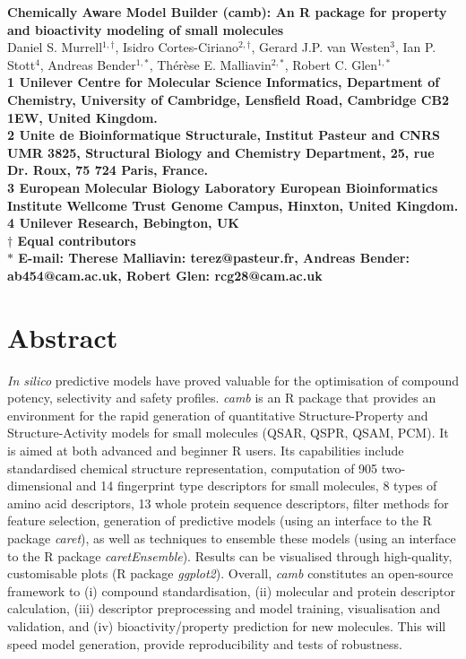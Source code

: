\documentclass[twoside,a4wide,10pt]{article}
\date{}
\begin{document}
\begin{flushleft}
{\Large
\textbf{Chemically Aware Model Builder (camb): An R package for property and bioactivity modeling of small molecules}
}
\\

Daniel S. Murrell$^{1,\dag}$,
Isidro Cortes-Ciriano$^{2,\dag}$,
Gerard J.P. van Westen$^{3}$,
Ian P. Stott$^{4}$,
Andreas Bender$^{1,\ast}$,
Th\'er\`ese E. Malliavin$^{2,\ast}$,
Robert C. Glen$^{1,\ast}$\\

\bf{1} Unilever Centre for Molecular Science Informatics, Department of Chemistry, University of Cambridge, Lensfield Road, Cambridge CB2 1EW, United Kingdom.
\\
\bf{2} Unite de Bioinformatique Structurale, Institut Pasteur and CNRS UMR 3825, Structural Biology and Chemistry Department, 25, rue Dr. Roux, 75 724 Paris, France.
\\
\bf{3} European Molecular Biology Laboratory European Bioinformatics Institute Wellcome Trust Genome Campus, Hinxton, United Kingdom.
\\
\bf{4} Unilever Research, Bebington, UK
\\
$\dag$ Equal contributors\\
$\ast$ E-mail: Therese Malliavin: terez@pasteur.fr, Andreas Bender: ab454@cam.ac.uk, Robert Glen: rcg28@cam.ac.uk


\end{flushleft}







\section*{Abstract}

{\it In silico} predictive models have proved valuable for the optimisation of compound potency, selectivity and safety profiles.
{\it camb} is an R package that provides an environment for the rapid generation of quantitative Structure-Property and Structure-Activity models for small molecules (QSAR, QSPR, QSAM, PCM). 
It is aimed at both advanced and beginner R users.
Its capabilities include standardised chemical structure representation, computation of 905 two-dimensional and 14 fingerprint type descriptors for small molecules, 8 types of amino acid descriptors, 13 whole protein sequence descriptors, filter methods for feature selection, 
generation of predictive models (using an interface to the R package {\it caret}), as well as techniques to ensemble these models (using an interface to the R package {\it caretEnsemble}).
Results can be visualised through high-quality, customisable plots (R package {\it ggplot2}).
Overall, {\it camb} constitutes an open-source framework to
(i) compound standardisation, (ii) molecular and protein descriptor calculation, 
(iii) descriptor preprocessing and model training, visualisation and validation, 
and (iv) bioactivity/property prediction for new molecules.
This will speed model generation, provide reproducibility and tests of robustness. 
\end{document}
